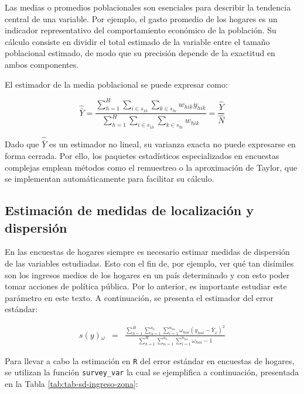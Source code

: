 \documentclass[
  spanish,
  12pt,
]{book}
\begin{document}
Las medias o promedios poblacionales son esenciales para describir la tendencia central de una variable. Por ejemplo, el gasto promedio de los hogares es un indicador representativo del comportamiento económico de la población. Su cálculo consiste en dividir el total estimado de la variable entre el tamaño poblacional estimado, de modo que su precisión depende de la exactitud en ambos componentes.

El estimador de la media poblacional se puede expresar como:

\[
\widehat{\bar{Y}} = \frac{\displaystyle \sum_{h=1}^{H} \sum_{i \in s_{1h}} \sum_{k \in s_{hi}} w_{hik} y_{hik}} {\displaystyle \sum_{h=1}^{H} \sum_{i \in s_{1h}} \sum_{k \in s_{hi}} w_{hik}} = \frac{\hat{Y}}{\hat{N}}
\]

Dado que \(\widehat{\bar{Y}}\) es un estimador no lineal, su varianza exacta no puede expresarse en forma cerrada. Por ello, los paquetes estadísticos especializados en encuestas complejas emplean métodos como el remuestreo o la aproximación de Taylor, que se implementan automáticamente para facilitar su cálculo.

\subsection{Estimación de medidas de localización y dispersión}\label{estimaciuxf3n-de-medidas-de-localizaciuxf3n-y-dispersiuxf3n}

En las encuestas de hogares siempre es necesario estimar medidas de dispersión de las variables estudiadas. Esto con el fin de, por ejemplo, ver qué tan disímiles son los ingresos medios de los hogares en un país determinado y con esto poder tomar acciones de política pública. Por lo anterior, es importante estudiar este parámetro en este texto. A continuación, se presenta el estimador del error estándar:

\begin{eqnarray}
s\left(y\right){}_{\omega} & = & \frac{\sum_{h=1}^{H}\sum_{\alpha=1}^{a_{h}}\sum_{i=1}^{n_{h\alpha}}\omega_{h\alpha i}\left(y_{h\alpha i}-\bar{Y}_{\omega}\right)^{2}}{\sum_{h=1}^{H}\sum_{\alpha=1}^{a_{h}}\sum_{i=1}^{n_{h\alpha}}\omega_{h\alpha i}-1}
\end{eqnarray}

Para llevar a cabo la estimación en \texttt{R} del error estándar en encuestas de hogares, se utilizan la función \texttt{survey\_var} la cual se ejemplifica a continuación, presentada en la Tabla \ref{tab:tab-sd-ingreso-zona}:
\end{document}
